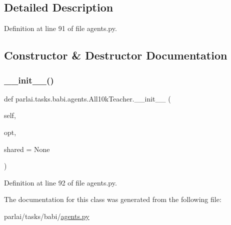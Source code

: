 \subsection{Detailed Description}


Definition at line 91 of file agents.\+py.



\subsection{Constructor \& Destructor Documentation}
\mbox{\label{classparlai_1_1tasks_1_1babi_1_1agents_1_1All10kTeacher_a6216cea03cc9b69cea9782819e2ede1d}} 
\subsubsection{\texorpdfstring{\+\_\+\+\_\+init\+\_\+\+\_\+()}{\_\_init\_\_()}}
{\footnotesize\ttfamily def parlai.\+tasks.\+babi.\+agents.\+All10k\+Teacher.\+\_\+\+\_\+init\+\_\+\+\_\+ (\begin{DoxyParamCaption}\item[{}]{self,  }\item[{}]{opt,  }\item[{}]{shared = {\ttfamily None} }\end{DoxyParamCaption})}



Definition at line 92 of file agents.\+py.



The documentation for this class was generated from the following file\+:\begin{DoxyCompactItemize}
\item 
parlai/tasks/babi/\hyperlink{parlai_2tasks_2babi_2agents_8py}{agents.\+py}\end{DoxyCompactItemize}
